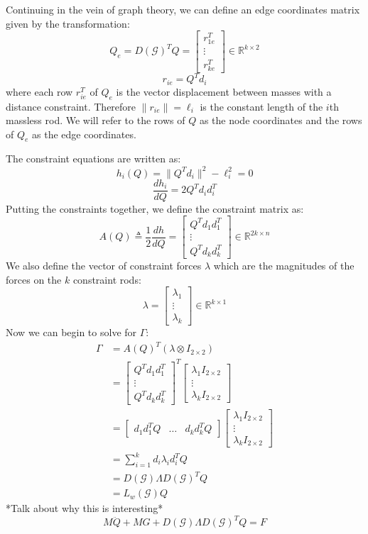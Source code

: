 \documentclass[conference]{article} %
\begin{document}
Continuing in the vein of graph theory, we can define an edge coordinates matrix given by the transformation:
$$Q_e=D(\mathcal{G})^TQ=\begin{bmatrix}
    r_{1e}^T\\ \vdots\\ r_{ke}^T
\end{bmatrix}\in\mathbb{R}^{k\times2}$$
$$r_{ie}=Q^Td_i$$
where each row $r_{ie}^T$ of $Q_e$ is the vector displacement between masses with a distance constraint. Therefore $\|r_{ie}\|=\ell_i$ is the constant length of the $i$th massless rod. We will refer to the rows of $Q$ as the node coordinates and the rows of $Q_e$ as the edge coordinates.

The constraint equations are written as:
$$h_i(Q)=\|Q^Td_i\|^2-\ell_i^2=0$$
$$\frac{dh_i}{dQ}=2Q^Td_id_i^T$$
Putting the constraints together, we define the constraint matrix as:
$$A(Q)\triangleq\frac{1}{2}\frac{dh}{dQ}=\begin{bmatrix}
    Q^Td_1d_1^T\\ \vdots\\ Q^Td_kd_k^T
\end{bmatrix}\in\mathbb{R}^{2k\times n}$$
We also define the vector of constraint forces $\lambda$ which are the magnitudes of the forces on the $k$ constraint rods:
$$\lambda=\begin{bmatrix}
    \lambda_1\\ \vdots\\ \lambda_k
\end{bmatrix}\in\mathbb{R}^{k\times 1}$$
Now we can begin to solve for $\Gamma$:
\begin{align*}
    \Gamma&=A(Q)^T(\lambda\otimes I_{2\times2})\\
    &=\begin{bmatrix}
        Q^Td_1d_1^T\\ \vdots\\ Q^Td_kd_k^T
    \end{bmatrix}^T\begin{bmatrix}
        \lambda_1I_{2\times2}\\ \vdots\\ \lambda_kI_{2\times2}
    \end{bmatrix}\\
    &=\begin{bmatrix}
        d_1d_1^TQ & \hdots & d_kd_k^TQ
    \end{bmatrix}\begin{bmatrix}
        \lambda_1I_{2\times2}\\ \vdots\\ \lambda_kI_{2\times2}
    \end{bmatrix}\\
    &= \sum_{i=1}^k d_i\lambda_id_i^TQ\\
    &= D(\mathcal{G})\Lambda D(\mathcal{G})^TQ\\
    &= L_w(\mathcal{G})Q
\end{align*}
*Talk about why this is interesting*
$$M\ddot{Q}+MG+D(\mathcal{G})\Lambda D(\mathcal{G})^TQ=F$$
\end{document}
